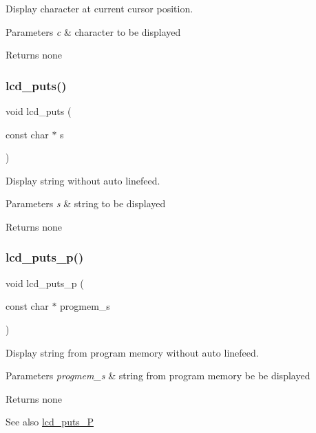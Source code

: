 Display character at current cursor position. 


\begin{DoxyParams}{Parameters}
{\em c} & character to be displayed \\
\hline
\end{DoxyParams}
\begin{DoxyReturn}{Returns}
none 
\end{DoxyReturn}
\mbox{\label{group__pfleury__lcd_ga8ffdfcac7638368ff04364c14984266e}} 
\subsubsection{\texorpdfstring{lcd\+\_\+puts()}{lcd\_puts()}}
{\footnotesize\ttfamily void lcd\+\_\+puts (\begin{DoxyParamCaption}\item[{const char $\ast$}]{s }\end{DoxyParamCaption})}



Display string without auto linefeed. 


\begin{DoxyParams}{Parameters}
{\em s} & string to be displayed \\
\hline
\end{DoxyParams}
\begin{DoxyReturn}{Returns}
none 
\end{DoxyReturn}
\mbox{\label{group__pfleury__lcd_ga9022a24a56a9b15681f62eb6ba77e5de}} 
\subsubsection{\texorpdfstring{lcd\+\_\+puts\+\_\+p()}{lcd\_puts\_p()}}
{\footnotesize\ttfamily void lcd\+\_\+puts\+\_\+p (\begin{DoxyParamCaption}\item[{const char $\ast$}]{progmem\+\_\+s }\end{DoxyParamCaption})}



Display string from program memory without auto linefeed. 


\begin{DoxyParams}{Parameters}
{\em progmem\+\_\+s} & string from program memory be be displayed \\
\hline
\end{DoxyParams}
\begin{DoxyReturn}{Returns}
none 
\end{DoxyReturn}
\begin{DoxySeeAlso}{See also}
\hyperlink{group__pfleury__lcd_ga4f1928f1515e21422d5a33af2949f2f7}{lcd\+\_\+puts\+\_\+P} 
\end{DoxySeeAlso}
